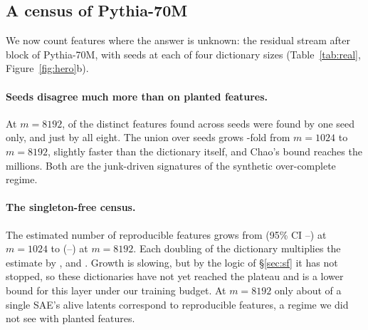 \subsection{A census of Pythia-70M}
\label{sec:real}

We now count features where the answer is unknown: the residual stream after block \RealLayer{} of Pythia-70M, with \RealSeeds{} seeds at each of four dictionary sizes (Table~\ref{tab:real}, Figure~\ref{fig:hero}b).

\begin{table}[t]
\centering\small
\caption{\textbf{Census of Pythia-70M} (layer \RealLayer, \RealSeeds{} seeds per size, $\tau=\MainTau$). FVU is the fraction of variance unexplained on held-out tokens (mean over seeds). ``Distinct, all seeds'' is the union over seeds. ``Seen $\ge2$'' counts features reproduced by at least two seeds. The interval is a 95\% bootstrap interval for the singleton-free estimate.}
\label{tab:real}

\end{table}

\paragraph{Seeds disagree much more than on planted features.} At $m=8192$, \RealSingleFrac{} of the distinct features found across seeds were found by one seed only, and just \RealAllSeedsEight{} by all eight. The union over seeds grows \RealUnionGrowth-fold from $m=1024$ to $m=8192$, slightly faster than the dictionary itself, and Chao's bound reaches the millions. Both are the junk-driven signatures of the synthetic over-complete regime.

\paragraph{The singleton-free census.} The estimated number of reproducible features grows from \RealSfOne{} (95\% CI \RealSfLoOne--\RealSfHiOne) at $m=1024$ to \RealSfEight{} (\RealSfLoEight--\RealSfHiEight) at $m=8192$. Each doubling of the dictionary multiplies the estimate by \RealGrowthOne, \RealGrowthTwo{} and \RealGrowthFour{}. Growth is slowing, but by the logic of \S\ref{sec:sf} it has not stopped, so these dictionaries have not yet reached the plateau and \RealSfEight{} is a lower bound for this layer under our training budget. At $m=8192$ only about \RealReproFrac{} of a single SAE's alive latents correspond to reproducible features, a regime we did not see with planted features.

